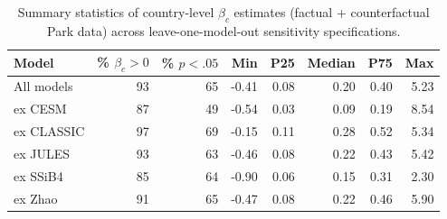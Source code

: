 \begin{table}[ht]
\centering
\caption{Summary statistics of country-level $\beta_c$ estimates (factual + counterfactual Park data) across leave-one-model-out sensitivity specifications.} 
\label{tab:beta_fact_cfact}
\begin{tabular}{lrrrrrrr}
  \toprule
Model & \% $\beta_c > 0$ & \% $p < .05$ & Min & P25 & Median & P75 & Max \\ 
  \midrule
All models & 93 & 65 & -0.41 & 0.08 & 0.20 & 0.40 & 5.23 \\ 
  ex CESM & 87 & 49 & -0.54 & 0.03 & 0.09 & 0.19 & 8.54 \\ 
  ex CLASSIC & 97 & 69 & -0.15 & 0.11 & 0.28 & 0.52 & 5.34 \\ 
  ex JULES & 93 & 63 & -0.46 & 0.08 & 0.22 & 0.43 & 5.42 \\ 
  ex SSiB4 & 85 & 64 & -0.90 & 0.06 & 0.15 & 0.31 & 2.30 \\ 
  ex Zhao & 91 & 65 & -0.47 & 0.08 & 0.22 & 0.46 & 5.90 \\ 
   \bottomrule
\end{tabular}
\end{table}
